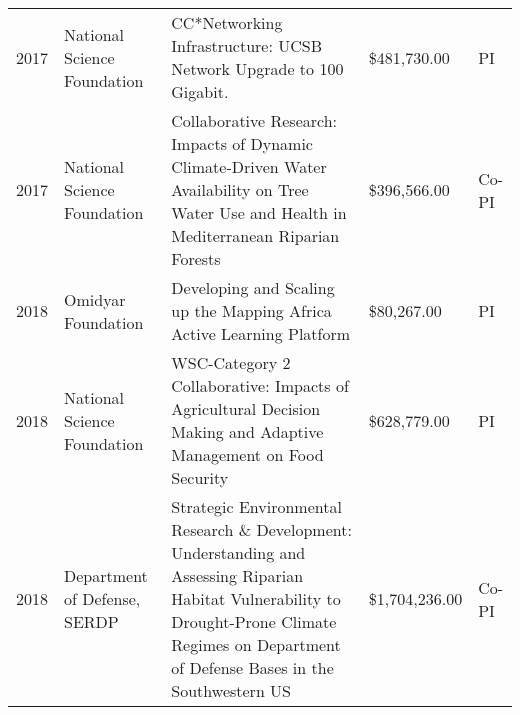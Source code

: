 
\begin{supertabular}{lp{3.5cm}p{7cm}ll}
2017 & National Science Foundation & CC*Networking Infrastructure: UCSB Network Upgrade to 100 Gigabit.  & \$481,730.00 & PI \\
2017 & National Science Foundation & Collaborative Research: Impacts of Dynamic Climate-Driven Water Availability on Tree Water Use and Health in Mediterranean Riparian Forests 
 & \$396,566.00 & Co-PI \\
2018 & Omidyar Foundation & Developing and Scaling up the Mapping Africa Active Learning Platform & \$80,267.00 & PI \\
2018 & National Science Foundation & WSC-Category 2 Collaborative: Impacts of Agricultural Decision Making and Adaptive Management on Food Security & \$628,779.00 & PI \\
2018 & Department of Defense, SERDP & Strategic Environmental Research \& Development: Understanding and Assessing Riparian Habitat Vulnerability to Drought-Prone Climate Regimes on Department of Defense Bases in the Southwestern US 
 & \$1,704,236.00 & Co-PI \\
\end{supertabular}

